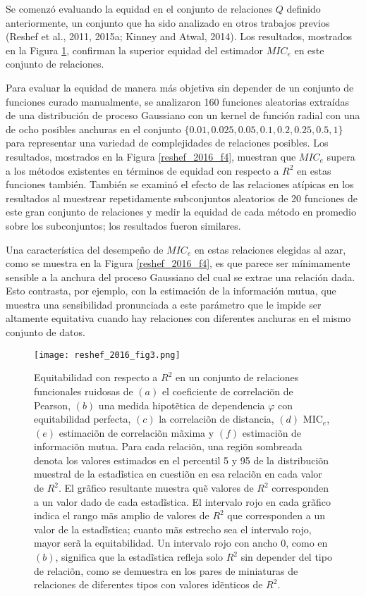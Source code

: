 	Se comenz\'o evaluando la equidad en el conjunto de relaciones $Q$ definido anteriormente, un conjunto que ha sido analizado en otros trabajos previos (Reshef et al., 2011, 2015a; Kinney and Atwal, 2014). Los resultados, mostrados en la Figura \ref{reshef_2016_f3}, confirman la superior equidad del estimador $MIC_e$ en este conjunto de relaciones.

	Para evaluar la equidad de manera m\'as objetiva sin depender de un conjunto de funciones curado manualmente, se analizaron 160 funciones aleatorias extra\'idas de una distribuci\'on de proceso Gaussiano con un kernel de funci\'on radial con una de ocho posibles anchuras en el conjunto $\{0.01, 0.025, 0.05, 0.1, 0.2, 0.25, 0.5, 1\}$ para representar una variedad de complejidades de relaciones posibles. Los resultados, mostrados en la Figura \ref{reshef_2016_f4}, muestran que $MIC_e$ supera a los m\'etodos existentes en t\'erminos de equidad con respecto a $R^2$ en estas funciones tambi\'en. Tambi\'en se examin\'o el efecto de las relaciones at\'ipicas en los resultados al muestrear repetidamente subconjuntos aleatorios de 20 funciones de este gran conjunto de relaciones y medir la equidad de cada m\'etodo en promedio sobre los subconjuntos; los resultados fueron similares.

	Una caracter\'istica del desempe\~no de $MIC_e$ en estas relaciones elegidas al azar, como se muestra en la Figura \ref{reshef_2016_f4}, es que parece ser m\'inimamente sensible a la anchura del proceso Gaussiano del cual se extrae una relaci\'on dada. Esto contrasta, por ejemplo, con la estimaci\'on de la informaci\'on mutua, que muestra una sensibilidad pronunciada a este par\'ametro que le impide ser altamente equitativa cuando hay relaciones con diferentes anchuras en el mismo conjunto de datos.

	\begin{figure}[H] 
		\centering
		\texttt{[image: reshef\_2016\_fig3.png]}
		\caption{Equitabilidad con respecto a $R^2$ en un conjunto de relaciones funcionales ruidosas de $(a)$ el coeficiente de correlaci\~on de Pearson, $(b)$ una medida hipot\~etica de dependencia $\varphi$ con equitabilidad perfecta, $(c)$ la correlaci\~on de distancia, $(d)$ $\mathrm{MIC}_e$, $(e)$ estimaci\~on de correlaci\~on m\~axima y $(f)$ estimaci\~on de informaci\~on mutua. Para cada relaci\~on, una regi\~on sombreada denota los valores estimados en el percentil 5 y 95 de la distribuci\~on muestral de la estad\~istica en cuesti\~on en esa relaci\~on en cada valor de $R^2$. El gr\~afico resultante muestra qu\~e valores de $R^2$ corresponden a un valor dado de cada estad\~istica. El intervalo rojo en cada gr\~afico indica el rango m\~as amplio de valores de $R^2$ que corresponden a un valor de la estad\~istica; cuanto m\~as estrecho sea el intervalo rojo, mayor ser\~a la equitabilidad. Un intervalo rojo con ancho 0, como en $(b)$, significa que la estad\~istica refleja solo $R^2$ sin depender del tipo de relaci\~on, como se demuestra en los pares de miniaturas de relaciones de diferentes tipos con valores id\~enticos de $R^2$.}
		\label{reshef_2016_f3}
	\end{figure}

